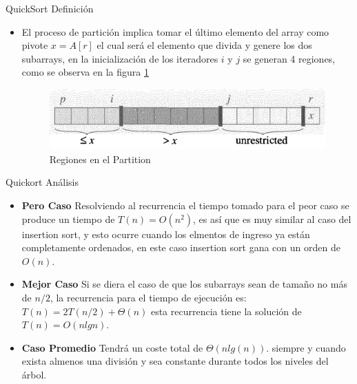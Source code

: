 \documentclass[11pt]{beamer}
\begin{document}
		    \begin{frame}{QuickSort Definición}
		        \begin{itemize}
		            \item El proceso de partici\'{o}n implica tomar el \'{u}ltimo elemento del array como pivote $x = A[r]$ el cual ser\'{a} el elemento que divida y genere los dos subarrays, en la inicializaci\'{o}n de los iteradores $i$ y $j$ se generan 4 regiones, como se observa en la figura \ref{fig:quicksort_regions}
                    
                    \begin{figure}[H]
                        \centering
                        \includegraphics[scale=0.20]{img/quicksort_regions.png}
                		\caption{Regiones en el Partition}
                		\label{fig:quicksort_regions}
                	\end{figure}
		        \end{itemize}
		    \end{frame}
		    
		    \begin{frame}{Quickort Análisis}
		        \begin{itemize}
		            \item \textbf{Pero Caso} Resolviendo al recurrencia el tiempo tomado para el peor caso se produce un tiempo de $T(n) = O(n^2)$, es as\'{i} que es muy similar al caso del insertion sort, y esto ocurre cuando los elmentos de ingreso ya est\'{a}n completamente ordenados, en este caso insertion sort gana con un orden de $O(n)$.
                    \item \textbf{Mejor Caso} Si se diera el caso de que los subarrays sean de tama\~{n}o no m\'{a}s de $n/2$, la recurrencia para el tiempo de ejecuci\'{o}n es: $T(n) = 2T(n/2) + \Theta(n)$ esta recurrencia tiene la soluci\'{o}n de $T(n) = O(nlgn)$.
                     \item \textbf{Caso Promedio}
                     Tendrá un coste total de $\Theta(nlg(n))$. siempre y cuando exista almenos una divisi\'{o}n y sea constante durante todos los niveles del \'{a}rbol.
		        \end{itemize}
		    \end{frame}
		    
\end{document}
